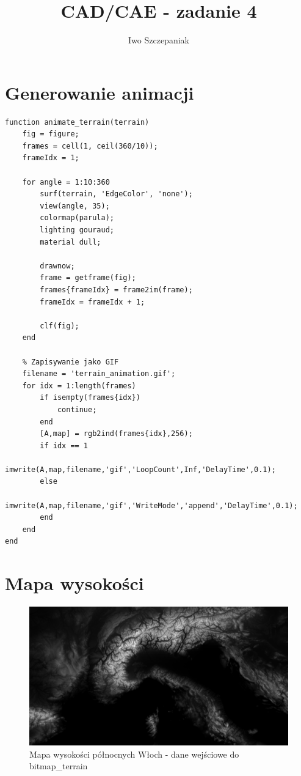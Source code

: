\documentclass{article}
\title{CAD/CAE - zadanie 4}
\author{Iwo Szczepaniak}
\begin{document}
\maketitle

\section{Generowanie animacji}

\begin{verbatim}
function animate_terrain(terrain)
    fig = figure;
    frames = cell(1, ceil(360/10));
    frameIdx = 1;
    
    for angle = 1:10:360
        surf(terrain, 'EdgeColor', 'none');
        view(angle, 35);
        colormap(parula);
        lighting gouraud;
        material dull;
        
        drawnow;
        frame = getframe(fig);
        frames{frameIdx} = frame2im(frame);
        frameIdx = frameIdx + 1;
        
        clf(fig);
    end
    
    % Zapisywanie jako GIF
    filename = 'terrain_animation.gif';
    for idx = 1:length(frames)
        if isempty(frames{idx})
            continue;
        end
        [A,map] = rgb2ind(frames{idx},256);
        if idx == 1
            imwrite(A,map,filename,'gif','LoopCount',Inf,'DelayTime',0.1);
        else
            imwrite(A,map,filename,'gif','WriteMode','append','DelayTime',0.1);
        end
    end
end
\end{verbatim}

\section{Mapa wysokości}

\begin{figure}[H]
    \centering
    \includegraphics[width=0.8\linewidth]{download.png}
    \caption{Mapa wysokości północnych Włoch \newline - dane wejściowe do bitmap\_terrain}
    \label{fig:height-map}
\end{figure}
\end{document}
